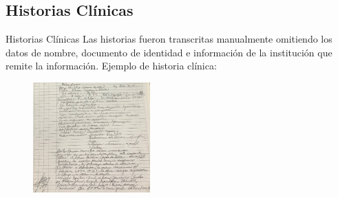 \documentclass[xcolor=dvipsnames]{beamer}
\begin{document}
\subsection{Historias Clínicas}
\begin{frame}{Historias Clínicas}
\justifying
Las historias fueron transcritas manualmente omitiendo los datos de nombre, documento de identidad e información de la institución que remite la información. Ejemplo de historia clínica:
\begin{figure}
\includegraphics[width=0.4\textwidth]{HC.JPG}
\end{figure}
\end{frame}
\end{document}
